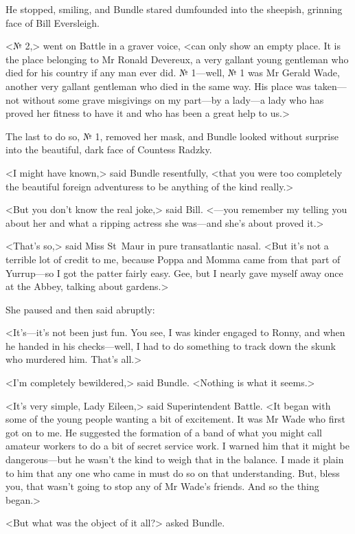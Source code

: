 He stopped, smiling, and Bundle stared dumfounded into the sheepish, grinning face of Bill Eversleigh.

<№ 2,> went on Battle in a graver voice, <can only show an empty place. It is the place belonging to Mr Ronald Devereux, a very gallant young gentleman who died for his country if any man ever did. № 1—well, № 1 was Mr Gerald Wade, another very gallant gentleman who died in the same way. His place was taken—not without some grave misgivings on my part—by a lady—a lady who has proved her fitness to have it and who has been a great help to us.>

The last to do so, № 1, removed her mask, and Bundle looked without surprise into the beautiful, dark face of Countess Radzky.

<I might have known,> said Bundle resentfully, <that you were too completely the beautiful foreign adventuress to be anything of the kind really.>

<But you don't know the real joke,> said Bill. <—you remember my telling you about her and what a ripping actress she was—and she's about proved it.>

<That's so,> said Miss St~Maur in pure transatlantic nasal. <But it's not a terrible lot of credit to me, because Poppa and Momma came from that part of Yurrup—so I got the patter fairly easy. Gee, but I nearly gave myself away once at the Abbey, talking about gardens.>

She paused and then said abruptly:

<It's—it's not been just fun. You see, I was kinder engaged to Ronny, and when he handed in his checks—well, I had to do something to track down the skunk who murdered him. That's all.>

<I'm completely bewildered,> said Bundle. <Nothing is what it seems.>

<It's very simple, Lady Eileen,> said Superintendent Battle. <It began with some of the young people wanting a bit of excitement. It was Mr Wade who first got on to me. He suggested the formation of a band of what you might call amateur workers to do a bit of secret service work. I warned him that it might be dangerous—but he wasn't the kind to weigh that in the balance. I made it plain to him that any one who came in must do so on that understanding. But, bless you, that wasn't going to stop any of Mr Wade's friends. And so the thing began.>

<But what was the object of it all?> asked Bundle.

